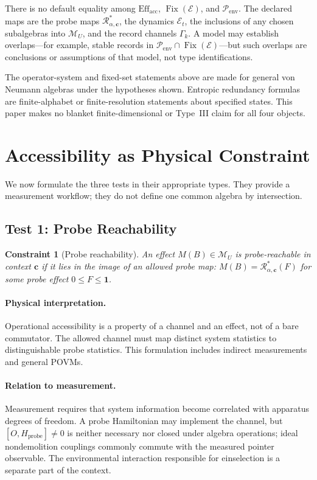 \documentclass[12pt,a4paper,openany]{book}
\newtheorem{constraint}[theorem]{Constraint}
\begin{document}
There is no default equality among $\mathrm{Eff}_{\mathrm{acc}}$, $\operatorname{Fix}(\mathcal E)$, and $\mathcal P_{\mathrm{env}}$.  The declared maps are the probe maps $\mathcal R_{\alpha,\mathbf c}^{*}$, the dynamics $\mathcal E_t$, the inclusions of any chosen subalgebras into $\mathcal M_U$, and the record channels $\Gamma_k$.  A model may establish overlaps---for example, stable records in $\mathcal P_{\mathrm{env}}\cap\operatorname{Fix}(\mathcal E)$---but such overlaps are conclusions or assumptions of that model, not type identifications.

The operator-system and fixed-set statements above are made for general von Neumann algebras under the hypotheses shown.  Entropic redundancy formulas are finite-alphabet or finite-resolution statements about specified states.  This paper makes no blanket finite-dimensional or Type~III claim for all four objects.

\section{Accessibility as Physical Constraint}
\label{E-sec:constraints}

We now formulate the three tests in their appropriate types.  They provide a measurement workflow; they do not define one common algebra by intersection.

\subsection{Test 1: Probe Reachability}

\begin{constraint}[Probe reachability]
\label{E-const:interaction}
An effect $M(B)\in\mathcal M_U$ is probe-reachable in context $\mathbf c$ if it lies in the image of an allowed probe map: $M(B)=\mathcal R_{\alpha,\mathbf c}^{*}(F)$ for some probe effect $0\le F\le\mathbf1$.
\end{constraint}

\paragraph{Physical interpretation.}
Operational accessibility is a property of a channel and an effect, not of a bare commutator.  The allowed channel must map distinct system statistics to distinguishable probe statistics.  This formulation includes indirect measurements and general POVMs.

\paragraph{Relation to measurement.}
Measurement requires that system information become correlated with apparatus degrees of freedom.  A probe Hamiltonian may implement the channel, but $[O,H_{\mathrm{probe}}]\ne0$ is neither necessary nor closed under algebra operations; ideal nondemolition couplings commonly commute with the measured pointer observable.  The environmental interaction responsible for einselection is a separate part of the context.
\end{document}
